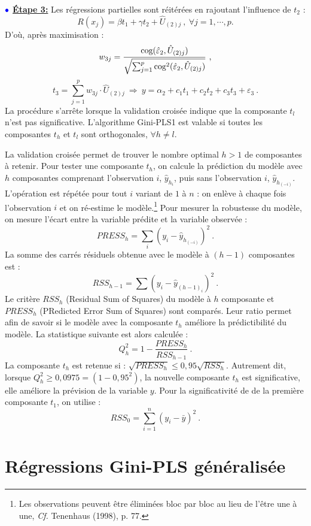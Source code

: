 $\bulle$ \underline{\textbf{Étape 3:}} Les régressions partielles sont réitérées en rajoutant l'influence de $t_2$ :
\[
R(x_j) = \beta t_1 + \gamma t_2 + \hat{U}_{(2)j} \ , \ \forall j = 1,\cdots, p.
\]
D'où, après maximisation :
\[
w_{3j} = \frac{\text{cog}(\hat{\varepsilon}_2,\hat{U}_{(2)j})}{\sqrt{\sum_{j=1}^p \text{cog}^2(\hat{\varepsilon}_2,\hat{U}_{(2)j})}} \ ,
\]
\[
t_3 = \sum_{j=1}^p w_{3j}\cdot \hat{U}_{(2)j} \ \Longrightarrow \ y = \alpha_2 + c_1 t_1 + c_2 t_2 + c_3 t_3 + \varepsilon_3 \ .
\]
La procédure s'arrête lorsque la validation croisée indique que la composante $t_l$ n'est pas significative. L'algorithme Gini-PLS1 est valable si toutes les composantes $t_h$ et $t_l$ sont orthogonales, $\forall h\neq l$. 

\medskip

La validation croisée permet de trouver le nombre optimal $h>1$ de composantes à retenir. Pour tester une composante $t_h$, on calcule la prédiction du modèle avec $h$ composantes comprenant l'observation $i$, $\hat{y}_{h_i}$, puis sans l'observation $i$, $\hat{y}_{h_{(-i)}}$. L'opération est répétée pour tout $i$ variant de $1$ à $n$ : on enlève à chaque fois l'observation $i$ et on ré-estime le modèle.\footnote{Les observations peuvent être éliminées bloc par bloc au lieu de l'être une à une, \emph{Cf.} Tenenhaus (1998), p. 77.} Pour mesurer la robustesse du modèle, on mesure l'écart entre la variable prédite et la variable observée :
\[
PRESS_h =  \sum_i\left(y_i - \hat{y}_{h_{(-i)}}\right)^2 \ .
\]
La somme des carrés résiduels obtenue avec le modèle à $(h-1)$ composantes est : 
\[
RSS_{h-1} = \sum \left(y_i - \hat{y}_{(h-1)_i}\right)^2 \ .
\]
Le critère $RSS_h$ (Residual Sum of Squares) du modèle à $h$ composante et $PRESS_h$ (PRedicted Error Sum of Squares) sont comparés. Leur ratio permet afin de savoir si le modèle avec la composante $t_h$ améliore la prédictibilité du modèle. La statistique suivante est alors calculée :
\[
Q^2_h =1 - \frac{PRESS_h}{RSS_{h-1}} \ .
\]
La composante $t_h$ est retenue si : $\sqrt{PRESS_h} \leq 0,95 \sqrt{RSS_h}$. Autrement dit, lorsque $Q^2_h \geq 0,0975 = (1 - 0,95^2)$, la nouvelle composante $t_h$ est significative, elle améliore la prévision de la variable $y$. Pour la significativité de de la première composante $t_1$,  on utilise :
\[
RSS_0 = \sum^{n}_{i = 1} \left(y_i - \bar{y}\right)^2  \ .
\]


\section{Régressions Gini-PLS généralisée} 

